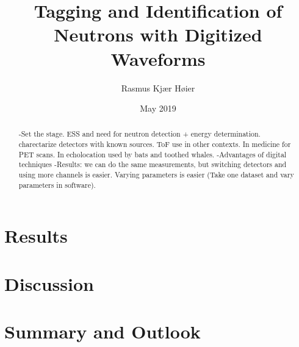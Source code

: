 \documentclass[12pt]{article}
\title{Tagging and Identification of Neutrons with Digitized Waveforms}
\author{Rasmus Kjær Høier}
\date{May 2019}
\begin{document}
\maketitle

\newpage
\setcounter{tocdepth}{3}
\tableofcontents

\newpage
\begin{abstract}
-Set the stage. ESS and need for neutron detection + energy determination. charectarize detectors with known sources. ToF use in other contexts. In medicine for PET scans. In echolocation used by bats and toothed whales.
-Advantages of digital techniques
-Results: we can do the same measurements, but switching detectors and using more channels is easier. Varying parameters is easier (Take one dataset and vary parameters in software).\cite{Leo}
\end{abstract}

\newpage
\onehalfspacing
{}
\setcounter{page}{1}
\clearpage
\clearpage
\section{Results}%
\clearpage
\section{Discussion}%
\clearpage
\section{Summary and Outlook}%
\clearpage

\end{document}
